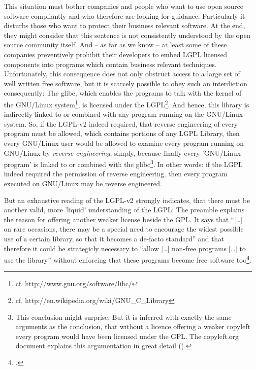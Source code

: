 This situation must bother companies and people who want to use open source
software compliantly and who therefore are looking for guidance. Particularly it
disturbs those who want to protect their business relevant software. At the end,
they might consider that this sentence is not consistently understood by the
open source community itself. And -- as far as we know -- at least some of these
companies preventively prohibit their developers to embed LGPL licensed
components into programs which contain business relevant techniques.
Unfortunately, this consequence does not only obstruct access to a large set of
well written free software, but it is scarcely possible to obey such an
interdiction consequently: The glibc, which enables the programs to talk with
the kernel of the GNU/Linux system\footnote{cf.
http://www.gnu.org/software/libc/}, is licensed under the LGPL\footnote{cf.
http://en.wikipedia.org/wiki/GNU\_C\_Library}. And hence, this library is
indirectly linked to or combined with any program running on the GNU/Linux
system. So, if the LGPL-v2 indeed required, that reverse engineering of every
program must be allowed, which contains portions of any LGPL Library, then every
GNU/Linux user would be allowed to examine every program running on GNU/Linux by
\emph{reverse engineering}, simply, because finally every 'GNU/Linux program' is
linked to or combined with the glibc\footnote{This conclusion might surprise.
But it is inferred with exactly the same arguments as the conclusion, that
without a licence offering a weaker copyleft every program would have been
licensed under the GPL. The copyleft.org document explains this argumentation in
great detail (\cite[cf.][56f]{KuhSebGin2014a}).}. In other words: if the LGPL
indeed required the permission of reverse engineering, then
every program executed on GNU/Linux may be reverse engineered.

But an exhaustive reading of the LGPL-v2 strongly indicates, that there must be
another valid, more 'liquid' understanding of the LGPL: The preamble explains
the reason for offering another weaker license beside the GPL. It says that
\enquote{[\ldots] on rare occasions, there may be a special need to encourage
the widest possible use of a certain library, so that it becomes a de-facto
standard} and that therefore it could be strategicly necessary to \enquote{allow
[\ldots] non-free programs [\ldots] to use the library} without enforcing that
these programs become free software too\footcite[cf.][\nopage wp,
§preamble]{Lgpl21OsiLicense1999a}.

